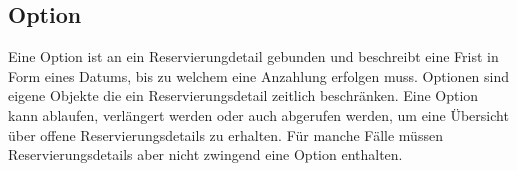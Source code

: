\documentclass[../../Pflichtenheft.tex]{subfiles}
\begin{document}
    \subsection{Option}
    Eine Option ist an ein Reservierungdetail gebunden und beschreibt eine Frist in Form eines Datums,
    bis zu welchem eine Anzahlung erfolgen muss. Optionen sind eigene Objekte die ein Reservierungsdetail
    zeitlich beschränken. Eine Option kann ablaufen, verlängert werden oder auch abgerufen werden, um
    eine Übersicht über offene Reservierungsdetails zu erhalten. Für manche Fälle müssen Reservierungsdetails
    aber nicht zwingend eine Option enthalten.
\end{document}
